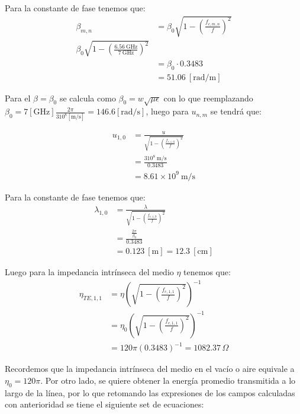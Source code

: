 \documentclass[
  11pt,
  letterpaper,
   addpoints,
   answers
  ]{exam}
\begin{document}
\begin{questions}
\begin{solution}
Para la constante de fase tenemos que:
\begin{align}
    \beta_{m,n} &= \beta_0 \sqrt{1 - \left( \frac{f_{c,m,n}}{f} \right)^2} \tag{87} \\
    \beta_{0} \sqrt{1 - \left( \frac{6.56\ \text{GHz}}{7\ \text{GHz}} \right)^2} \tag{88} \\
    &= \beta_0 \cdot 0.3483 \tag{89} \\
    &= 51.06\ [\text{rad/m}] \tag{90}
\end{align}

Para el $\beta = \beta_0$ se calcula como $\beta_0 = w \sqrt{\mu \epsilon}$ con lo que reemplazando $\beta_0 = 7[\text{GHz}] \frac{2\pi}{310^8 [\text{m/s}]} = 146.6[\text{rad/s}]$, luego para $u_{n,m}$ se tendrá que:

\begin{align}
    u_{1,0} &= \frac{u}{\sqrt{1-\left( \frac{f_{c,1,0}}{f} \right)^2}} \tag{91} \\
    &= \frac{310^8\ \text{m/s}}{0.3483} \tag{92} \\
    &= 8.61 \times 10^9\ \text{m/s} \tag{93}
\end{align}

Para la constante de fase tenemos que:
\begin{align}
    \lambda_{1,0} &= \frac{\lambda}{\sqrt{1 - \left( \frac{f_{c,1,0}}{f} \right)^2}} \tag{94} \\
    &= \frac{\frac{2\pi}{\beta_0}}{0.3483} \tag{95} \\
    &= 0.123\ [\text{m}] = 12.3\ [\text{cm}] \tag{96}
\end{align}

Luego para la impedancia intrínseca del medio $\eta$ tenemos que:
\begin{align}
    \eta_{TE,1,1} &= \eta \left( \sqrt{1 - \left( \frac{f_{c,1,1}}{f} \right)^2} \right)^{-1} \tag{97} \\
    &= \eta_0 \left( \sqrt{1 - \left( \frac{f_{c,1,1}}{f} \right)^2} \right)^{-1} \tag{98} \\
    &= 120\pi (0.3483)^{-1} = 1082.37\,\Omega \tag{99}
\end{align}

Recordemos que la impedancia intrínseca del medio en el vacío o aire equivale a $\eta_0 = 120\pi$. Por otro lado, se quiere obtener la energía promedio transmitida a lo largo de la línea, por lo que retomando las expresiones de los campos calculadas con anterioridad se tiene el siguiente set de ecuaciones:


\end{solution}
\end{questions}
\end{document}
